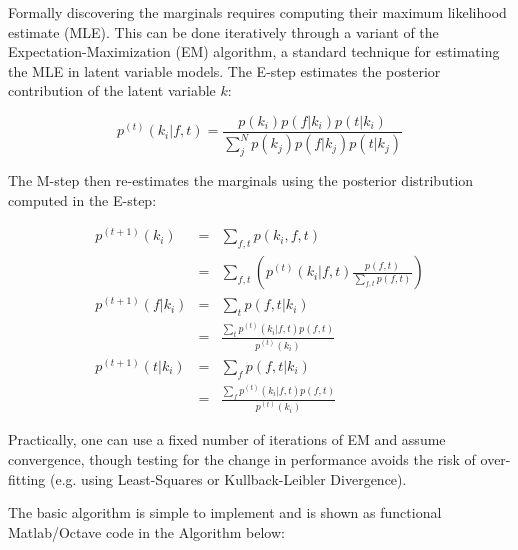 \documentclass[a4paper,11pt,final]{ThesisStyle}
\begin{document}
Formally discovering the marginals requires computing their maximum likelihood estimate (MLE).  This can be done iteratively through a variant of the Expectation-Maximization (EM) algorithm, a standard technique for estimating the MLE in latent variable models.  The E-step estimates the posterior contribution of the latent variable $k$:

\begin{equation}
p^{(t)}(k_i|f,t) = \frac{p(k_i)p(f|k_i)p(t|k_i)}{\sum_{j}^{N}p(k_j)p(f|k_j)p(t|k_j)}  
\end{equation}

The M-step then re-estimates the marginals using the posterior distribution computed in the E-step:

\begin{eqnarray}
p^{(t+1)}(k_i) &=& \sum_{f,t}p(k_i,f,t)  \\
&=& \sum_{f,t}\left(p^{(t)}(k_i|f,t)\frac{p(f,t)}{\sum_{f,t}p(f,t)}\right)  \\
p^{(t+1)}(f|k_i) &=& \sum_{t}p(f,t|k_i)  \\
&=& \frac{\sum_{t}p^{(t)}(k_i|f,t)p(f,t)}{p^{(t)}(k_i)}  \\
p^{(t+1)}(t|k_i) &=& \sum_{f}p(f,t|k_i)  \\
&=& \frac{\sum_{f}p^{(t)}(k_i|f,t)p(f,t)}{p^{(t)}(k_i)}  
\end{eqnarray}

Practically, one can use a fixed number of iterations of EM and assume convergence, though testing for the change in performance avoids the risk of over-fitting \cite{Hofmann1999} (e.g. using Least-Squares or Kullback-Leibler Divergence).   

The basic algorithm is simple to implement and is shown as functional Matlab/Octave code in the Algorithm below: 
\end{document}
